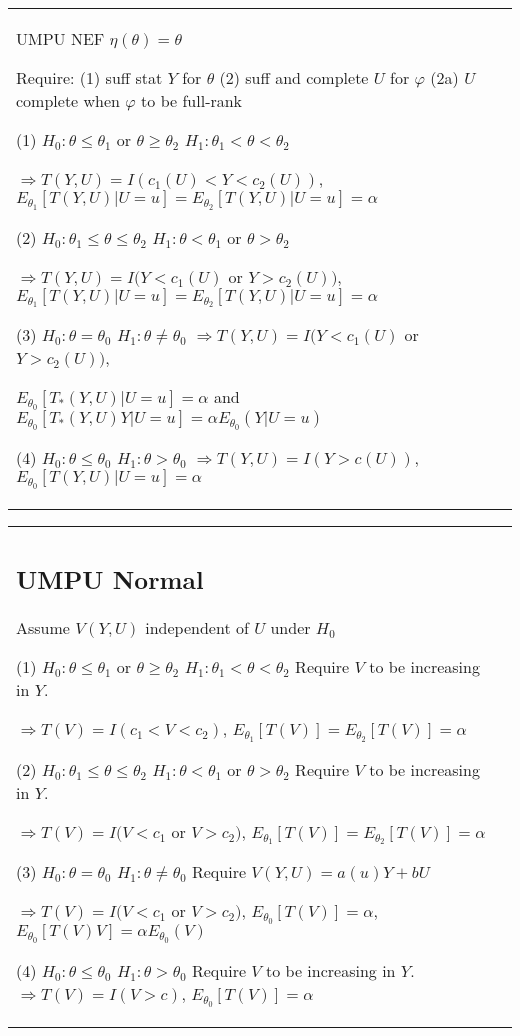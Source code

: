 \begin{tabulary}{\textwidth}{l || L}

	\subsection{UMPU NEF\\$\eta(\theta) = \theta$}

	Require:
	(1) suff stat $Y$ for $\theta$
	(2) suff and complete $U$ for $\varphi$
	(2a) $U$ complete when $\varphi$ to be full-rank

	(1) $H_0: \theta\leq \theta_1$ or $\theta\geq \theta_2$ $H_1: \theta_1<\theta<\theta_2$

	$\Rightarrow T(Y, U) = I(c_1(U) < Y < c_2(U))$,
	$E_{\theta_1}[T(Y, U)|U=u] = E_{\theta_2}[T(Y, U)|U=u] =\alpha$

	(2) $H_0: \theta_1 \leq \theta \leq \theta_2$ $H_1: \theta < \theta_1$ or $\theta > \theta_2$

	$\Rightarrow T(Y, U) = I(Y < c_1(U)$ or $ Y > c_2(U))$,
	$E_{\theta_1}[T(Y, U)|U=u] = E_{\theta_2}[T(Y, U)|U=u] =\alpha$


	(3) $H_0: \theta=\theta_0$ $H_1: \theta\neq\theta_0$
	$\Rightarrow T(Y, U) = I(Y < c_1(U)$ or $ Y > c_2(U))$,

	$E_{\theta_0}[T_*(Y, U)|U=u]=\alpha$ and
	$E_{\theta_0}[T_*(Y, U)Y| U=u]=\alpha E_{\theta_0}(Y|U=u)$

	(4) $H_0: \theta\leq \theta_0$ $H_1: \theta>\theta_0$
	$\Rightarrow T(Y, U) = I(Y > c(U))$,
	$E_{\theta_0}[T(Y, U)|U=u]=\alpha$

\end{tabulary}

\begin{tabulary}{\textwidth}{l || L}

	\subsection{UMPU Normal}

	Assume $V(Y, U)$ independent of $U$ under $H_0$

	(1) $H_0: \theta\leq \theta_1$ or $\theta\geq \theta_2$ $H_1: \theta_1<\theta<\theta_2$
	Require $V$ to be increasing in $Y$.

	$\Rightarrow T(V) = I(c_1 < V < c_2)$,
	$E_{\theta_1}[T(V)] = E_{\theta_2}[T(V)] = \alpha$

	(2) $H_0: \theta_1 \leq \theta \leq \theta_2$ $H_1: \theta < \theta_1$ or $\theta > \theta_2$
	Require $V$ to be increasing in $Y$.

	$\Rightarrow T(V) = I(V < c_1$ or $V > c_2)$,
	$E_{\theta_1}[T(V)] = E_{\theta_2}[T(V)] = \alpha$

	(3) $H_0: \theta=\theta_0$ $H_1: \theta\neq\theta_0$
	Require $V(Y, U)=a(u)Y + bU$

	$\Rightarrow T(V) = I(V < c_1$ or $ V > c_2)$,
	$E_{\theta_0}[T(V)] = \alpha$,
	$E_{\theta_0}[T(V)V] = \alpha E_{\theta_0}(V)$

	(4) $H_0: \theta\leq \theta_0$ $H_1: \theta>\theta_0$
	Require $V$ to be increasing in $Y$.
	$\Rightarrow T(V) = I(V>c)$,
	$E_{\theta_0}[T(V)] = \alpha$

\end{tabulary}

